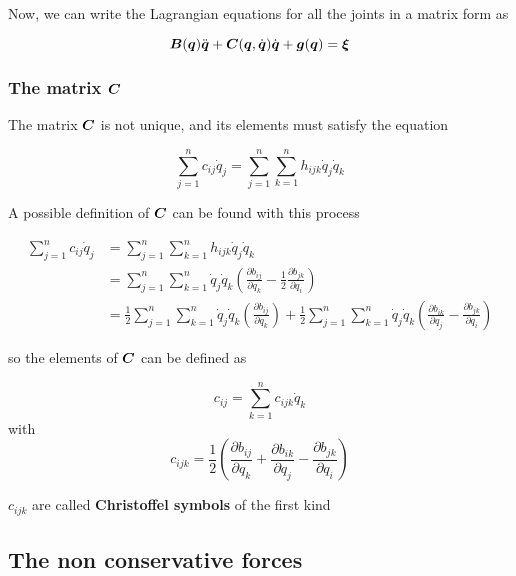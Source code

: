 Now, we can write the Lagrangian equations for all the joints in a matrix form as

\begin{equation}
    \boldsymbol{B}(\boldsymbol{q})\ddot{\boldsymbol{q}} + \boldsymbol{C}(\boldsymbol{q},\dot{\boldsymbol{q}})\dot{\boldsymbol{q}} + \boldsymbol{g}(\boldsymbol{q}) = \boldsymbol{\xi} \label{eq:dynamics-generalized-forces}
\end{equation}

\subsubsection{The matrix $\boldsymbol{C}$}\label{subsubsec:matrix-c}

The matrix $\boldsymbol{C}$ is not unique, and its elements must satisfy the equation

\[
	\sum_{j=1}^n c_{ij} \dot{q}_j = \sum_{j=1}^n \sum_{k=1}^n h_{ijk} \dot{q}_j \dot{q}_k
\]

A possible definition of $\boldsymbol{C}$ can be found with this process

\begin{align*}
    \sum_{j=1}^n c_{ij} \dot{q}_j &= \sum_{j=1}^n \sum_{k=1}^n h_{ijk} \dot{q}_j \dot{q}_k \\
    &= \sum_{j=1}^n \sum_{k=1}^n  \dot{q}_j \dot{q}_k \left( \frac{\partial b_{ij}}{\partial q_k} - \frac{1}{2} \frac{\partial b_{jk}}{\partial q_i} \right) \\
    &= \frac{1}{2} \sum_{j=1}^n \sum_{k=1}^n  \dot{q}_j \dot{q}_k \left( \frac{\partial b_{ij}}{\partial q_k} \right) +
    \frac{1}{2} \sum_{j=1}^n \sum_{k=1}^n  \dot{q}_j \dot{q}_k \left( \frac{\partial b_{ik}}{\partial q_j} - \frac{\partial b_{jk}}{\partial q_i} \right)
\end{align*}

so the elements of $\boldsymbol{C}$ can be defined as

\begin{equation}
    c_{ij} = \sum_{k=1}^n c_{ijk}\dot{q}_k \label{eq:matrix-c-coefficients}
\end{equation}
with
\[
	c_{ijk} = \frac{1}{2} \left( \frac{\partial b_{ij}}{\partial q_k} + \frac{\partial b_{ik}}{\partial q_j} - \frac{\partial b_{jk}}{\partial q_i} \right)
\]

$c_{ijk}$ are called \textbf{Christoffel symbols} of the first kind

\subsection{The non conservative forces}

